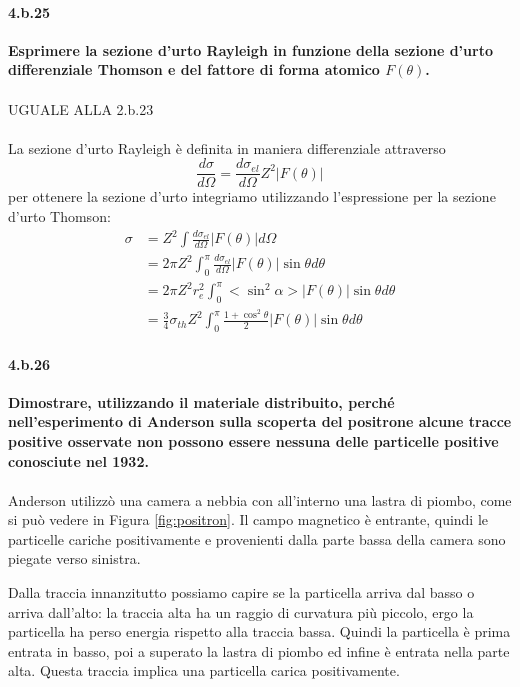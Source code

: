 \documentclass[twoside]{article}
\begin{document}
\paragraph{4.b.25}\textbf{Esprimere la sezione d'urto Rayleigh in funzione della sezione d'urto differenziale Thomson e del fattore di forma atomico $F(\theta)$.}\\
\\
UGUALE ALLA 2.b.23\\
\\
La sezione d'urto Rayleigh è definita in maniera differenziale attraverso
\begin{equation}
    \frac{d\sigma}{d\Omega}=\frac{d\sigma_{el}}{d\Omega}Z^2|F(\theta)|
\end{equation}
per ottenere la sezione d'urto integriamo utilizzando l'espressione per la sezione d'urto Thomson:
\begin{align}
    \sigma&=Z^2\int\frac{d\sigma_{el}}{d\Omega}|F(\theta)|d\Omega\\
          &=2\pi Z^2\int_0^\pi\frac{d\sigma_{el}}{d\Omega}|F(\theta)|\sin\theta d\theta\\
          &=2\pi Z^2r_e^2\int_0^\pi<\sin^2\alpha>|F(\theta)|\sin\theta d\theta\\
          &=\frac{3}{4}\sigma_{th}Z^2\int_0^\pi\frac{1+\cos^2\theta}{2}|F(\theta)|\sin\theta d\theta
\end{align}
\paragraph{4.b.26}\textbf{Dimostrare, utilizzando il materiale distribuito, perché nell'esperimento di Anderson sulla scoperta del positrone alcune tracce positive osservate non possono essere nessuna delle particelle positive conosciute nel 1932.}\\
\\
Anderson utilizzò una camera a nebbia con all'interno una lastra di piombo, come si può vedere in Figura \ref{fig:positron}. Il campo magnetico è entrante, quindi le particelle cariche positivamente e provenienti dalla parte bassa della camera sono piegate verso sinistra.

Dalla traccia innanzitutto possiamo capire se la particella arriva dal basso o arriva dall'alto: la traccia alta ha un raggio di curvatura più piccolo, ergo la particella ha perso energia rispetto alla traccia bassa. Quindi la particella è prima entrata in basso, poi a superato la lastra di piombo ed infine è entrata nella parte alta. Questa traccia implica una particella carica positivamente.
\end{document}
